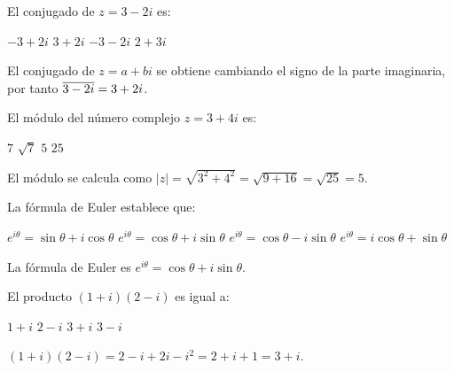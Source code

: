 \begin{questions}


  \question El conjugado de $z = 3 - 2i$ es:

  \begin{choices}
    \choice $-3 + 2i$
    \CorrectChoice $3 + 2i$
    \choice $-3 - 2i$
    \choice $2 + 3i$
  \end{choices}
  \begin{solution}
    El conjugado de $z = a + bi$ se obtiene cambiando el signo de la parte imaginaria, por tanto $\overline{3 - 2i} = 3 + 2i$.
  \end{solution}

  \question El módulo del número complejo $z = 3 + 4i$ es:

  \begin{choices}
    \choice $7$
    \choice $\sqrt{7}$
    \CorrectChoice $5$
    \choice $25$
  \end{choices}
  \begin{solution}
    El módulo se calcula como $|z| = \sqrt{3^2 + 4^2} = \sqrt{9 + 16} = \sqrt{25} = 5$.
  \end{solution}

  \question La fórmula de Euler establece que:

  \begin{choices}
    \choice $e^{i\theta} = \sin\theta + i\cos\theta$
    \CorrectChoice $e^{i\theta} = \cos\theta + i\sin\theta$
    \choice $e^{i\theta} = \cos\theta - i\sin\theta$
    \choice $e^{i\theta} = i\cos\theta + \sin\theta$
  \end{choices}
  \begin{solution}
    La fórmula de Euler es $e^{i\theta} = \cos\theta + i\sin\theta$.
  \end{solution}

  \question El producto $(1 + i)(2 - i)$ es igual a:

  \begin{choices}
    \choice $1 + i$
    \choice $2 - i$
    \CorrectChoice $3 + i$
    \choice $3 - i$
  \end{choices}
  \begin{solution}
    $(1 + i)(2 - i) = 2 - i + 2i - i^2 = 2 + i + 1 = 3 + i$.
  \end{solution}


\end{questions}

